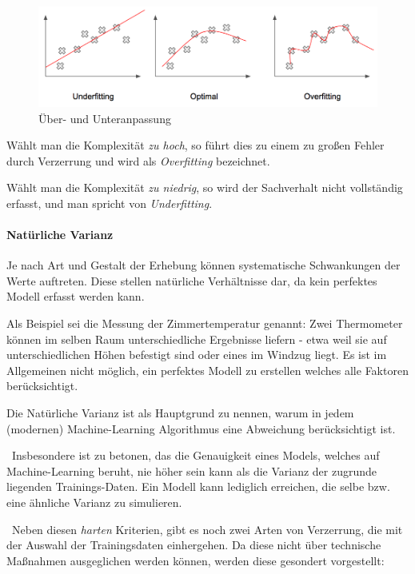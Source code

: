 \begin{figure}[h]
	\begin{center}
		\includegraphics[width=0.6\linewidth]{Bilder/Overfitting}
		\caption[Über- und Unteranpassung: \url{
			https://pythonmachinelearning.pro/a-guide-to-improving-deep-learnings-performance/}]{Über- und Unteranpassung}
		\label{fig:Overfitting}
	\end{center}
\end{figure}

Wählt man die Komplexität \textit{zu hoch}, so führt dies zu einem zu großen Fehler durch Verzerrung und wird als \textit{Overfitting} bezeichnet. 

Wählt man die Komplexität \textit{zu niedrig}, so wird der Sachverhalt nicht vollständig erfasst, und man spricht von \textit{Underfitting}.
\paragraph{Natürliche Varianz} Je nach Art und Gestalt der Erhebung können systematische Schwankungen der Werte auftreten. Diese stellen natürliche Verhältnisse dar, da kein perfektes Modell erfasst werden kann. 

Als Beispiel sei die Messung der Zimmertemperatur genannt: Zwei Thermometer können im selben Raum unterschiedliche Ergebnisse liefern - etwa weil sie auf unterschiedlichen Höhen befestigt sind oder eines im Windzug liegt. Es ist im Allgemeinen nicht möglich, ein perfektes Modell zu erstellen welches alle Faktoren berücksichtigt.

Die Natürliche Varianz ist als Hauptgrund zu nennen, warum in jedem (modernen) Machine-Learning Algorithmus eine Abweichung berücksichtigt ist.

~\newline Insbesondere ist  zu betonen, das die Genauigkeit eines Models, welches auf Machine-Learning beruht, nie höher sein kann als die Varianz der zugrunde liegenden Trainings-Daten. Ein Modell kann lediglich erreichen, die selbe bzw. eine ähnliche Varianz zu simulieren.

~\newline Neben diesen \textit{harten} Kriterien, gibt es noch zwei Arten von Verzerrung, die mit der Auswahl der Trainingsdaten einhergehen. Da diese nicht über technische Maßnahmen ausgeglichen werden können, werden diese gesondert vorgestellt:
